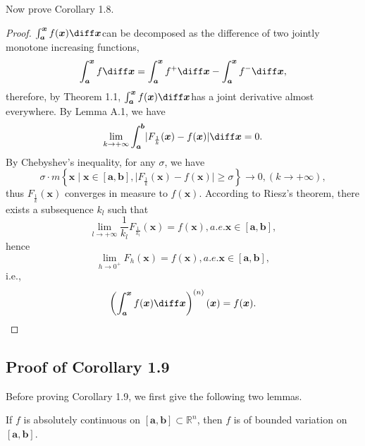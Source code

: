 \documentclass{ijclclp}
\begin{document}
Now prove Corollary 1.8.
\begin{proof}
    \(\int_{\boldsymbol{a}}^{\boldsymbol{x}} f(\boldsymbol{x})\diff \boldsymbol{x}\)can be decomposed as the difference of two jointly monotone increasing functions, 
    \[\int_{\boldsymbol{a}}^{\boldsymbol{x}} f\diff \boldsymbol{x}=\int_{\boldsymbol{a}}^{\boldsymbol{x}} f^+\diff \boldsymbol{x}-\int_{\boldsymbol{a}}^{\boldsymbol{x}} f^-\diff \boldsymbol{x},\]
    therefore, by Theorem 1.1, \(\int_{\boldsymbol{a}}^{\boldsymbol{x}}f(\boldsymbol{x})\diff \boldsymbol{x}\)has a joint derivative almost everywhere. By Lemma A.1, we have 
    \[\lim_{k\to+\infty}\int_{\boldsymbol{a}}^{\boldsymbol{b}}\lvert F_{\frac{1}{k}}(\boldsymbol{x})-f(\boldsymbol{x})\rvert\diff \boldsymbol{x}=0.\]
    By Chebyshev's inequality, for any \(\sigma\), we have
    \[\sigma\cdot m\left\{\boldsymbol{x}\mid \boldsymbol{x}\in[\boldsymbol{a},\boldsymbol{b}],\lvert F_{\frac{1}{k}}(\boldsymbol{x})-f(\boldsymbol{x})\rvert\geq\sigma\right\}\rightarrow0,(k\rightarrow+\infty),\]
    thus \(F_{\frac{1}{k}}(\boldsymbol{x})\) converges in measure to \(f(\boldsymbol{x})\). According to Riesz's theorem, there exists a subsequence \(k_l\) such that
    \[\lim_{l\to+\infty}\frac{1}{k_l}F_{\frac{1}{k_l}}(\boldsymbol{x})=f(\boldsymbol{x}),a.e.\boldsymbol{x}\in[\boldsymbol{a},\boldsymbol{b}],\]
    hence
    \[\lim_{h\to 0^+}F_h(\boldsymbol{x})=f(\boldsymbol{x}),a.e.\boldsymbol{x}\in[\boldsymbol{a},\boldsymbol{b}],\]
    i.e.,
    \[\left(\int_{\boldsymbol{a}}^{\boldsymbol{x}}f(\boldsymbol{x})\diff \boldsymbol{x}\right)^{(n)}(\boldsymbol{x})=f(\boldsymbol{x}).\]
\end{proof}
\subsection{Proof of Corollary 1.9}
Before proving Corollary 1.9, we first give the following two lemmas.
\begin{lemma}
    If \(f\) is absolutely continuous on \([\boldsymbol{a},\boldsymbol{b}]\subset\mathbb{R}^n\), then \(f\) is of bounded variation on \([\boldsymbol{a},\boldsymbol{b}]\).
\end{lemma}
\end{document}
